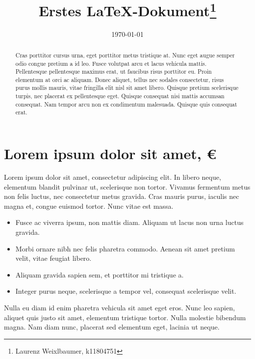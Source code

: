 \documentclass[a4paper, 12pt, notitlepage]{report}
\begin{document}
    \title{Erstes \LaTeX-Dokument\thanks{Laurenz Weixlbaumer, k11804751}}
    \date{\today}

    \maketitle

    \begin{abstract}
        Cras porttitor cursus urna, eget porttitor metus tristique at. Nunc eget augue semper odio congue pretium a id leo. Fusce volutpat arcu et lacus vehicula mattis. Pellentesque pellentesque maximus erat, ut faucibus risus porttitor eu. Proin elementum at orci ac aliquam. Donec aliquet, tellus nec sodales consectetur, risus purus mollis mauris, vitae fringilla elit nisl sit amet libero. Quisque pretium scelerisque turpis, nec placerat ex pellentesque eget. Quisque consequat nisi mattis accumsan consequat. Nam tempor arcu non ex condimentum malesuada. Quisque quis consequat erat.
    \end{abstract}

    \chapter{Lorem ipsum dolor sit amet, \euro}
    \thispagestyle{fancy}

    Lorem ipsum dolor sit amet, consectetur adipiscing elit. In libero neque, elementum blandit pulvinar ut, scelerisque non tortor. Vivamus fermentum metus non felis luctus, nec consectetur metus gravida. Cras mauris purus, iaculis nec magna et, congue euismod tortor. Nunc vitae est massa. 
    
    \begin{itemize}
        \item Fusce ac viverra ipsum, non mattis diam. Aliquam ut lacus non urna luctus gravida.
        \item Morbi ornare nibh nec felis pharetra commodo. Aenean sit amet pretium velit, vitae feugiat libero.
        \item Aliquam gravida sapien sem, et porttitor mi tristique a.
        \item Integer purus neque, scelerisque a tempor vel, consequat scelerisque velit.
    \end{itemize}
    
    Nulla eu diam id enim pharetra vehicula sit amet eget eros. Nunc leo sapien, aliquet quis justo sit amet, elementum tristique tortor. Nulla molestie bibendum magna. Nam diam nunc, placerat sed elementum eget, lacinia ut neque.
\end{document}
